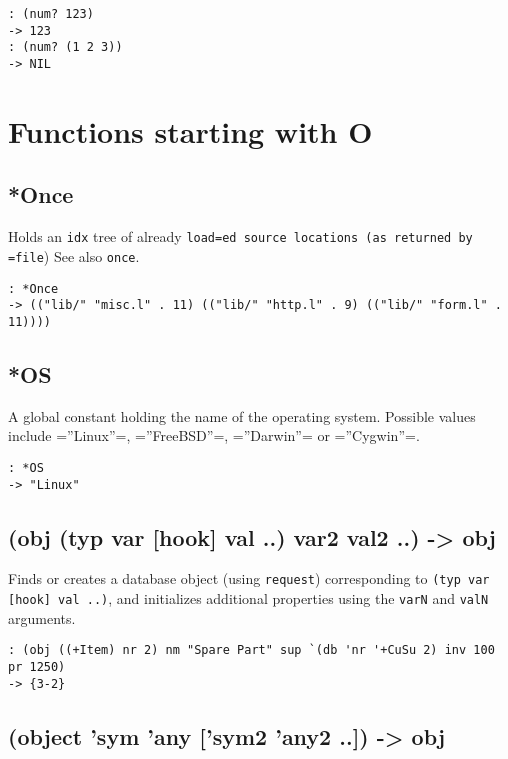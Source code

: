 {{{{{{{\begin{verbatim}
: (num? 123)
-> 123
: (num? (1 2 3))
-> NIL
\end{verbatim}


\chapter{Functions starting with O}
\label{sec-8-1-15}


 
\section{*Once}
\label{sec-8-1-15-1}


Holds an \texttt{idx} tree of already \texttt{load=ed source locations (as returned by =file}) See also \texttt{once}.


\begin{verbatim}
: *Once
-> (("lib/" "misc.l" . 11) (("lib/" "http.l" . 9) (("lib/" "form.l" . 11))))
\end{verbatim}

 
\section{*OS}
\label{sec-8-1-15-2}


A global constant holding the name of the operating system. Possible
values include =''Linux''=, =''FreeBSD''=, =''Darwin''= or =''Cygwin''=.


\begin{verbatim}
: *OS
-> "Linux"
\end{verbatim}

 
\section{(obj (typ var [hook] val ..) var2 val2 ..) -> obj}
\label{sec-8-1-15-3}


Finds or creates a database object (using \texttt{request}) corresponding to
\texttt{(typ var [hook] val ..)}, and initializes additional properties using
the \texttt{varN} and \texttt{valN} arguments.


\begin{verbatim}
: (obj ((+Item) nr 2) nm "Spare Part" sup `(db 'nr '+CuSu 2) inv 100 pr 1250)
-> {3-2}
\end{verbatim}

 
\section{(object 'sym 'any ['sym2 'any2 ..]) -> obj}
\label{sec-8-1-15-4}


}}}}}}}
